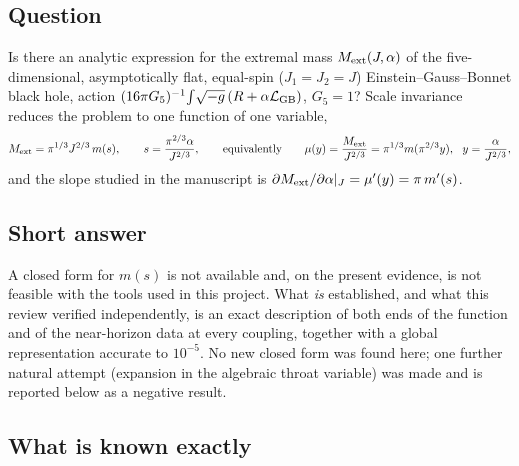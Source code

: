 
\subsection*{Question}

Is there an analytic expression for the extremal mass $M_{\rm ext}(J,\alpha)$ of the
five-dimensional, asymptotically flat, equal-spin ($J_1=J_2=J$) Einstein--Gauss--Bonnet black
hole, action $(16\pi G_5)^{-1}\!\int\!\sqrt{-g}\,(R+\alpha\mathcal L_{\rm GB})$, $G_5=1$?
Scale invariance reduces the problem to one function of one variable,
\begin{equation}
 M_{\rm ext}=\pi^{1/3}J^{2/3}\,m(s),\qquad s=\frac{\pi^{2/3}\alpha}{J^{2/3}},
 \qquad\text{equivalently}\qquad \mu(y)=\frac{M_{\rm ext}}{J^{2/3}}=\pi^{1/3}m(\pi^{2/3}y),\ \ y=\frac{\alpha}{J^{2/3}},
\end{equation}
and the slope studied in the manuscript is $\partial M_{\rm ext}/\partial\alpha|_J=\mu'(y)=\pi\,m'(s)$.

\subsection*{Short answer}

A closed form for $m(s)$ is not available and, on the present evidence, is not feasible with
the tools used in this project. What \emph{is} established, and what this review verified
independently, is an exact description of both ends of the function and of the near-horizon
data at every coupling, together with a global representation accurate to $10^{-5}$. No new
closed form was found here; one further natural attempt (expansion in the algebraic throat
variable) was made and is reported below as a negative result.

\subsection*{What is known exactly}

